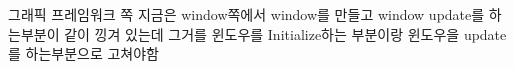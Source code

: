 
\begin{DoxyEnumerate}
\item 그래픽 프레임워크 쪽 지금은 window쪽에서 window를 만들고 window update를 하는부분이 같이 낑겨 있는데 그거를 윈도우를 Initialize하는 부분이랑 윈도우을 update를 하는부분으로 고쳐야함 
\end{DoxyEnumerate}